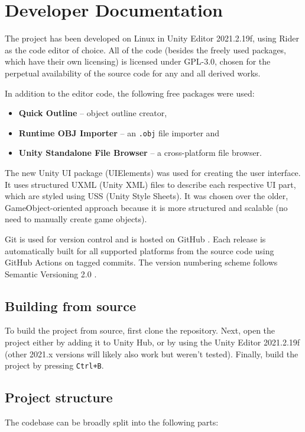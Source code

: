 \section{Developer Documentation}\label{sec:progdoc}

The project has been developed on Linux in Unity Editor 2021.2.19f, using Rider as the code editor of choice.
All of the code (besides the freely used packages, which have their own licensing) is licensed under GPL-3.0, chosen for the perpetual availability of the source code for any and all derived works.

In addition to the editor code, the following free packages were used:

\begin{itemize}
	\item \textbf{Quick Outline} \cite{quickoutline} -- object outline creator,
	\item \textbf{Runtime OBJ Importer} \cite{objimport} -- an \verb|.obj| file importer and
	\item \textbf{Unity Standalone File Browser} \cite{unitystandalonefilebrowser} -- a cross-platform file browser.
\end{itemize}

The new Unity UI package (UIElements) was used for creating the user interface.
It uses structured UXML (Unity XML) files to describe each respective UI part, which are styled using USS (Unity Style Sheets).
It was chosen over the older, GameObject-oriented approach because it is more structured and scalable (no need to manually create game objects).

Git is used for version control and is hosted on GitHub \cite{cled}.
Each release is automatically built for all supported platforms from the source code using GitHub Actions on tagged commits.
The version numbering scheme follows Semantic Versioning 2.0 \cite{semver}.

\subsection{Building from source}
To build the project from source, first clone the repository.
Next, open the project either by adding it to Unity Hub, or by using the Unity Editor 2021.2.19f (other 2021.x versions will likely also work but weren't tested).
Finally, build the project by pressing \verb|Ctrl+B|.

\subsection{Project structure}
The codebase can be broadly split into the following parts:

